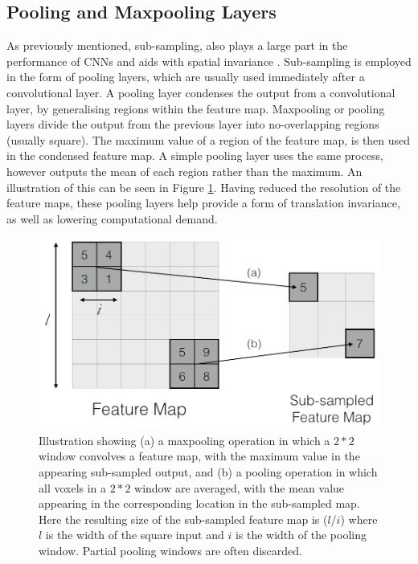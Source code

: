 \documentclass[11pt,a4paper]{memoir}
\numberwithin{figure}{section}
\numberwithin{table}{section}
\numberwithin{equation}{section}
\begin{document}
\subsection{Pooling and Maxpooling Layers}
As previously mentioned, sub-sampling, also plays a large part in the performance of CNNs and aids with spatial invariance \cite{RanzatoMarcAurelio2007UnsupervisedRecognition}. Sub-sampling is employed in the form of pooling layers, which are usually used immediately after a convolutional layer. A pooling layer condenses the output from a convolutional layer, by generalising regions within the feature map. Maxpooling or pooling layers divide the output from the previous layer into no-overlapping regions (usually square). The maximum value of a region of the feature map, is then used in the condensed feature map. A simple pooling layer uses the same process, however outputs the mean of each region rather than the maximum. An illustration of this can be seen in Figure \ref{fig:MPool}. Having reduced the resolution of the feature maps, these pooling layers help provide a form of translation invariance, as well as lowering computational demand. 

\begin{figure}[!h]
\centering
\includegraphics[scale=0.37]{MPool.jpg}
\caption[Illustration of a pooling and maxpooling operation in a convolutional neural network ]{Illustration showing (a) a maxpooling operation in which a $2*2$  window convolves a feature map, with the maximum value in the appearing sub-sampled output, and (b) a pooling operation in which all voxels in a $2*2$ window are averaged, with the mean value appearing in the corresponding location in the sub-sampled map. Here the resulting size of the sub-sampled feature map is ($ l /i$) where $l$ is the width of the square input and $i$ is the width of the pooling window. Partial pooling windows are often discarded.}
\label{fig:MPool}
\end{figure}
\end{document}
